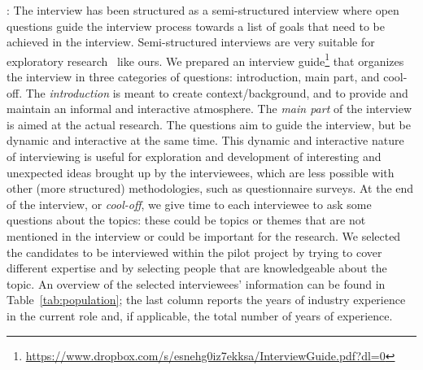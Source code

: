 : The interview has been structured as a semi-structured interview where open questions guide the interview process towards a list of goals that need to be achieved in the interview. Semi-structured interviews are very suitable for exploratory research~\cite{Runeson:2009:GCR:1519313.1519324} %
{like ours}. 
We prepared an interview guide\footnote{\url{https://www.dropbox.com/s/esnehg0iz7ekksa/InterviewGuide.pdf?dl=0}} that organizes the interview in three categories of questions: introduction, main %
{part}, and cool-off.
The {\em introduction} is meant to create context/background, and to provide and maintain an informal and interactive atmosphere. %
The {\em main part} of the interview is aimed at the actual research. The questions aim to guide the interview, but be dynamic and interactive at the same time. This dynamic and interactive nature of interviewing is useful for exploration and development of interesting and unexpected ideas brought up by the interviewees, which are less possible with other (more structured) methodologies, such as questionnaire surveys.
At the end of the interview, or {\em cool-off}, we give time to each interviewee to ask some questions about the topics: these could be topics or themes that are not mentioned in the interview or could be important for the research. We selected the candidates to be interviewed within the pilot project by trying to cover different expertise and by selecting people that are knowledgeable about the topic.
An overview of the selected interviewees' information can be found in Table~\ref{tab:population}; %
the last column reports the years of industry experience in the current role and, if applicable, the total number of years of experience.%


